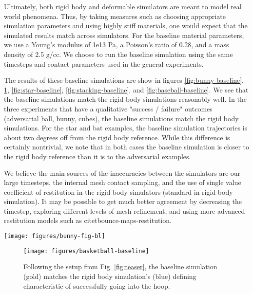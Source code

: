 Ultimately, both rigid body and deformable simulators are meant to model real world phenomena. Thus, by taking measures such as choosing appropriate simulation parameters and using highly stiff materials, one would expect that the simulated results match across simulators. 
For the baseline material parameters, we use a Young's modulus of 1e13 Pa, a Poisson's ratio of 0.28, and a mass density of 2.5 g/cc.
We choose to run the baseline simulation using the same timesteps and contact parameters used in the general experiments.

The results of these baseline simulations are show in figures \ref{fig:bunny-baseline}, \ref{fig:basketball-baseline}, \ref{fig:star-baseline}, \ref{fig:stacking-baseline}, and \ref{fig:baseball-baseline}. We see that the baseline simulations match the rigid body simulations reasonably well. In the three experiments that have a qualitative "success / failure" outcomes (adversarial ball, bunny, cubes), the baseline simulations match the rigid body simulations. For the star and bat examples, the baseline simulation trajectories is about two degrees off from the rigid body reference. While this difference is certainly nontrivial, we note that in both cases the baseline simulation is closer to the rigid body reference than it is to the adversarial examples.

We believe the main sources of the inaccuracies between the simulators are our large timesteps, the internal mesh contact sampling, and the use of single value coefficient of restitution in the rigid body simulators (standard in rigid body simulation). It may be possible to get much better agreement by decreasing the timestep, exploring different levels of mesh refinement, and using more advanced restitution models such as citet{bounce-maps-restitution}.

\begin{figure*}[t]
 \centering
  \texttt{[image: figures/bunny-fig-bl]}
 \caption{Following the setup from Fig. \ref{fig:bunny-example}, the baseline simulation (gold) matches the rigid body simulation's (blue) defining characteristic of successfully going into the bin. Note that the trajectories are in very close agreement.} 
 \label{fig:bunny-baseline}
\end{figure*}

\begin{figure}[t]
	\texttt{[image: figures/basketball-baseline]}
	\vspace{-0.7cm}
 \caption{Following the setup from Fig. \ref{fig:teaser}, the baseline simulation (gold) matches the rigid body simulation's (blue) defining characteristic of successfully going into the hoop.} 
	 \label{fig:basketball-baseline}
\end{figure}

